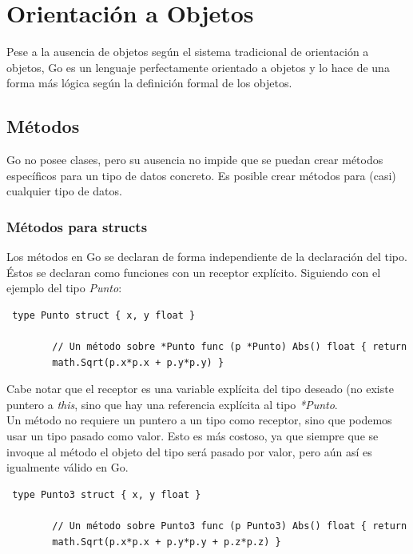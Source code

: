 
\chapter{Orientación a Objetos}

Pese a la ausencia de objetos según el sistema tradicional de orientación
a objetos, Go es un lenguaje perfectamente orientado a objetos y lo hace de una
forma más lógica según la definición formal de los objetos.

\section{Métodos}

Go no posee clases, pero su ausencia no impide que se puedan crear métodos
específicos para un tipo de datos concreto. Es posible crear métodos para (casi)
cualquier tipo de datos.

	\subsection{Métodos para structs}

	Los métodos en Go se declaran de forma independiente de la declaración del
	tipo. Éstos se declaran como funciones con un receptor explícito. Siguiendo
	con el ejemplo del tipo \textit{Punto}:

	\begin{verbatim} type Punto struct { x, y float }
    
		// Un método sobre *Punto func (p *Punto) Abs() float { return
		math.Sqrt(p.x*p.x + p.y*p.y) } \end{verbatim}

	Cabe notar que el receptor es una variable explícita del tipo deseado (no
	existe puntero a \textit{this}, sino que hay una referencia explícita al
	tipo \textit{*Punto}.\\

	Un método no requiere un puntero a un tipo como receptor, sino que podemos
	usar un tipo pasado como valor. Esto es más costoso, ya que siempre que se
	invoque al método el objeto del tipo será pasado por valor, pero aún así es
	igualmente válido en Go.

	\begin{verbatim} type Punto3 struct { x, y float }
    
		// Un método sobre Punto3 func (p Punto3) Abs() float { return
		math.Sqrt(p.x*p.x + p.y*p.y + p.z*p.z) } \end{verbatim}

